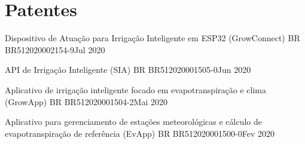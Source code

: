 \section{Patentes}
\resumeSubHeadingListStart
\resumePubliSubheading
{Dispositivo de Atuação para Irrigação Inteligente em ESP32 (GrowConnect)}
{BR BR512020002154-9}{Jul 2020}

\resumePubliSubheading
{API de Irrigação Inteligente (SIA)}
{BR BR512020001505-0}{Jun 2020}

\resumePubliSubheading
{Aplicativo de irrigação inteligente focado em evapotranspiração e clima (GrowApp)}
{BR BR512020001504-2}{Mai 2020}

\resumePubliSubheading
{Aplicativo para gerenciamento de estações meteorológicas e cálculo de evapotranspiração de referência (EvApp)}
{BR BR512020001500-0}{Fev 2020}

\resumeSubHeadingListEnd
